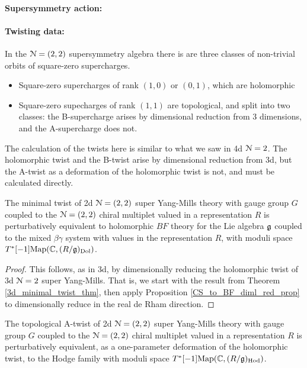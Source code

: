 \documentclass[10pt, oneside]{article}
\begin{document}
\vspace{-10pt}
\paragraph{Supersymmetry action:} 

\vspace{-10pt}
\paragraph{Twisting data:}
In the $\mathcal{N}=(2,2)$ supersymmetry algebra there is are three classes of non-trivial orbits of square-zero supercharges.  
\begin{itemize}
 \item Square-zero supercharges of rank $(1,0)$ or $(0,1)$, which are holomorphic
 \item Square-zero supecharges of rank $(1,1)$ are topological, and split into two classes: the B-supercharge arises by dimensional reduction from 3 dimensions, and the A-supercharge does not.
\end{itemize}

The calculation of the twists here is similar to what we saw in 4d $\mathcal{N}=2$.  The holomorphic twist and the B-twist arise by dimensional reduction from 3d, but the A-twist as a deformation of the holomorphic twist is not, and must be calculated directly.

\begin{theorem} \label{2d_minimal_twist_thm}
The minimal twist of 2d $\mathcal N=(2,2)$ super Yang-Mills theory with gauge group $G$ coupled to the $\mathcal N=(2,2)$ chiral multiplet valued in a representation $R$ is perturbatively equivalent to holomorphic $BF$ theory for the Lie algebra $\mathfrak g$ coupled to the mixed $\beta\gamma$ system with values in the representation $R$, with moduli space $T^*[-1]\mathrm{Map}(\mathbb C, (R/\mathfrak{g})_{\mathrm{Dol}})$. 
\end{theorem}

\begin{proof}
This follows, as in 3d, by dimensionally reducing the holomorphic twist of 3d $\mathcal{N}=2$ super Yang-Mills.  That is, we start with the result from Theorem \ref{3d_minimal_twist_thm}, then apply Proposition \ref{CS_to_BF_diml_red_prop} to dimensionally reduce in the real de Rham direction.
\end{proof}

\begin{theorem} \label{2d_2_A_twist_thm}
The topological A-twist of 2d $\mathcal{N}=(2,2)$ super Yang-Mills theory with gauge group $G$ coupled to the $\mathcal{N}=(2,2)$ chiral multiplet valued in a representation $R$ is perturbatively equivalent, as a one-parameter deformation of the holomorphic twist, to the Hodge family with moduli space $T^*[-1]\mathrm{Map}(\mathbb C, (R/\mathfrak{g})_{\mathrm{Hod}})$.
\end{theorem}
\end{document}
